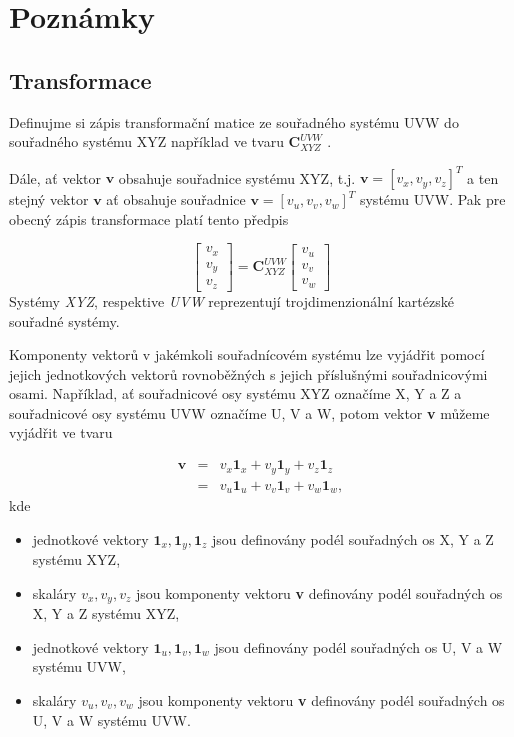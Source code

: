 \section{Poznámky}

\subsection{Transformace}

Definujme si zápis transformační matice ze souřadného systému UVW do souřadného systému XYZ například ve tvaru $\mathbf{C}_{XYZ}^{UVW}$ \cite{Grewal2001}.

Dále, ať vektor $\mathbf{v}$ obsahuje souřadnice systému XYZ, t.j. $\mathbf{v} = \left[v_{x}, v_{y}, v_{z}\right]^{T}$ a ten stejný vektor $\mathbf{v}$ ať obsahuje souřadnice $\mathbf{v} = \left[v_{u}, v_{v}, v_{w}\right]^{T}$ systému UVW. Pak pre obecný zápis transformace platí tento předpis

\begin{equation}
\begin{bmatrix}
v_{x} \\
v_{y} \\
v_{z}
\end{bmatrix} = \mathbf{C}^{UVW}_{XYZ}
\begin{bmatrix}
v_{u} \\
v_{v} \\
v_{w}
\end{bmatrix}
\label{rov:transGeneral}
\end{equation}
Systémy \textit{XYZ}, respektive \textit{UVW} reprezentují trojdimenzionální kartézské souřadné systémy.

Komponenty vektorů v jakémkoli souřadnícovém systému lze vyjádřit pomocí jejich jednotkových vektorů rovnoběžných s jejich příslušnými souřadnicovými osami. Například, ať souřadnicové osy systému XYZ označíme X, Y a Z a souřadnicové osy systému UVW označíme U, V a W, potom vektor \textbf{v} můžeme vyjádřit ve tvaru

\begin{eqnarray}
\mathbf{v} &=& v_{x}\mathbf{1}_{x} + v_{y}\mathbf{1}_{y} + v_{z}\mathbf{1}_{z} \\ \nonumber
           &=& v_{u}\mathbf{1}_{u} + v_{v}\mathbf{1}_{v} + v_{w}\mathbf{1}_{w}, 
\end{eqnarray}
kde
\begin{itemize}
\item jednotkové vektory $\mathbf{1}_{x}, \mathbf{1}_{y}, \mathbf{1}_{z}$ jsou definovány podél souřadných os X, Y a Z systému XYZ,
\item skaláry $v_{x}, v_{y}, v_{z}$ jsou komponenty vektoru \textbf{v} definovány podél souřadných os X, Y a Z systému XYZ,
\item jednotkové vektory $\mathbf{1}_{u}, \mathbf{1}_{v}, \mathbf{1}_{w}$ jsou definovány podél souřadných os U, V a W systému UVW, 
\item skaláry $v_{u}, v_{v}, v_{w}$ jsou komponenty vektoru \textbf{v} definovány podél souřadných os U, V a W systému UVW. 
\end{itemize}

